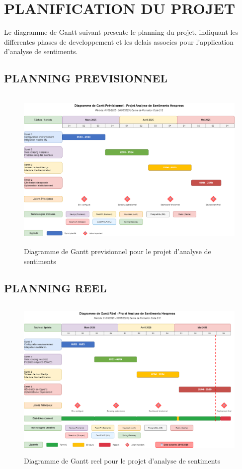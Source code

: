 \section{PLANIFICATION DU PROJET}

Le diagramme de Gantt suivant presente le planning du projet, indiquant les differentes phases de developpement et les delais associes pour l'application d'analyse de sentiments.

\subsection{PLANNING PREVISIONNEL}

\begin{figure}[H]
\centering
\includegraphics[height=8cm , width=\textwidth]{assets/images/gantt-previsionnel.png}
\caption{Diagramme de Gantt previsionnel pour le projet d'analyse de sentiments}
\label{fig:gantt-prev}
\end{figure}

\subsection{PLANNING REEL}

\begin{figure}[H]
\centering
\includegraphics[height=8cm , width=\textwidth]{assets/images/gantt-reel.png}
\caption{Diagramme de Gantt reel pour le projet d'analyse de sentiments}
\label{fig:gantt-reel}
\end{figure}


